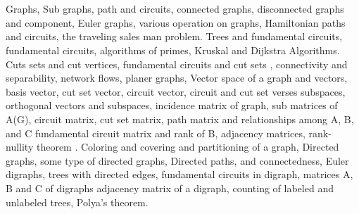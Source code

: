 %
%
% 
%
%
%
%
%
%
%


\section{\dsccourseinfo}
 

Graphs, Sub graphs, path and circuits, connected graphs, disconnected graphs and component, Euler graphs, various operation on graphs, Hamiltonian paths and circuits, the traveling sales man problem. Trees and fundamental circuits, fundamental circuits, algorithms of primes, Kruskal and Dijkstra Algorithms. Cuts sets and cut vertices, fundamental circuits and cut sets , connectivity and separability, network flows, planer graphs, Vector space of a graph and vectors, basis vector, cut set vector, circuit vector, circuit and cut set verses subspaces, orthogonal vectors and subspaces, incidence matrix of graph, sub matrices of A(G), circuit matrix, cut set matrix, path matrix and relationships among A, B, and C fundamental circuit matrix and rank of B, adjacency matrices, rank- nullity theorem . Coloring and covering and partitioning of a graph, Directed graphs, some type of directed graphs, Directed paths, and connectedness, Euler digraphs, trees with directed edges, fundamental circuits in digraph, matrices A, B and C of digraphs adjacency matrix of a digraph, counting of labeled and unlabeled trees, Polya's theorem. 

